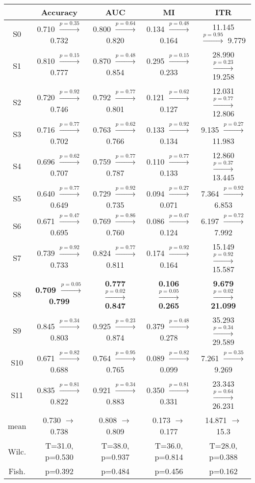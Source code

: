 \begin{tabular}{c c c c c}
\toprule
 & Accuracy & AUC & MI & ITR\\
\midrule
S0 &  0.710 $\xrightarrow{p=0.35}$  0.732 &  0.800 $\xrightarrow{p=0.64}$  0.820 &  0.134 $\xrightarrow{p=0.48}$  0.164 & 11.145 $\xrightarrow{p=0.95}$  9.779\\
S1 &  0.810 $\xrightarrow{p=0.15}$  0.777 &  0.870 $\xrightarrow{p=0.48}$  0.854 &  0.295 $\xrightarrow{p=0.15}$  0.233 & 28.990 $\xrightarrow{p=0.23}$ 19.258\\
S2 &  0.720 $\xrightarrow{p=0.92}$  0.746 &  0.792 $\xrightarrow{p=0.77}$  0.801 &  0.121 $\xrightarrow{p=0.62}$  0.127 & 12.031 $\xrightarrow{p=0.77}$ 12.806\\
S3 &  0.716 $\xrightarrow{p=0.77}$  0.702 &  0.763 $\xrightarrow{p=0.62}$  0.766 &  0.133 $\xrightarrow{p=0.92}$  0.134 &  9.135 $\xrightarrow{p=0.27}$ 11.983\\
S4 &  0.696 $\xrightarrow{p=0.62}$  0.707 &  0.759 $\xrightarrow{p=0.77}$  0.787 &  0.110 $\xrightarrow{p=0.77}$  0.133 & 12.860 $\xrightarrow{p=0.37}$ 13.445\\
S5 &  0.640 $\xrightarrow{p=0.77}$  0.649 &  0.729 $\xrightarrow{p=0.92}$  0.735 &  0.094 $\xrightarrow{p=0.27}$  0.071 &  7.364 $\xrightarrow{p=0.92}$  6.853\\
S6 &  0.671 $\xrightarrow{p=0.47}$  0.695 &  0.769 $\xrightarrow{p=0.86}$  0.760 &  0.086 $\xrightarrow{p=0.47}$  0.124 &  6.197 $\xrightarrow{p=0.72}$  7.992\\
S7 &  0.739 $\xrightarrow{p=0.92}$  0.733 &  0.824 $\xrightarrow{p=0.77}$  0.811 &  0.174 $\xrightarrow{p=0.92}$  0.164 & 15.149 $\xrightarrow{p=0.92}$ 15.587\\
S8 & \textbf{ 0.709 $\xrightarrow{p=0.05}$  0.799} & \textbf{ 0.777 $\xrightarrow{p=0.02}$  0.847} & \textbf{ 0.106 $\xrightarrow{p=0.05}$  0.265} & \textbf{ 9.679 $\xrightarrow{p=0.02}$ 21.099}\\
S9 &  0.845 $\xrightarrow{p=0.34}$  0.803 &  0.925 $\xrightarrow{p=0.23}$  0.874 &  0.379 $\xrightarrow{p=0.48}$  0.278 & 35.293 $\xrightarrow{p=0.34}$ 29.589\\
S10 &  0.671 $\xrightarrow{p=0.82}$  0.688 &  0.764 $\xrightarrow{p=0.95}$  0.765 &  0.089 $\xrightarrow{p=0.82}$  0.099 &  7.261 $\xrightarrow{p=0.35}$  9.269\\
S11 &  0.835 $\xrightarrow{p=0.81}$  0.822 &  0.921 $\xrightarrow{p=0.34}$  0.883 &  0.350 $\xrightarrow{p=0.81}$  0.331 & 23.343 $\xrightarrow{p=0.64}$ 26.231\\
\midrule
mean & 0.730 $\rightarrow$ 0.738 & 0.808 $\rightarrow$ 0.809 & 0.173 $\rightarrow$ 0.177 & 14.871 $\rightarrow$ 15.3\\
Wilc. & T=31.0, p=0.530 & T=38.0, p=0.937 & T=36.0, p=0.814 & T=28.0, p=0.388\\
Fish. & p=0.392 & p=0.484 & p=0.456 & p=0.162\\
\bottomrule
\end{tabular}
